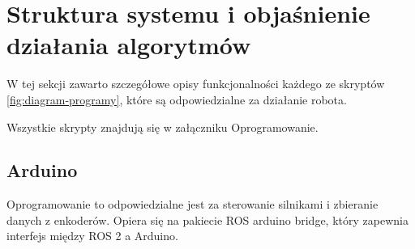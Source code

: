 \documentclass[a4paper,twoside,12pt]{book}
\begin{document}
\newpage
\section{Struktura systemu i objaśnienie działania algorytmów}

W tej sekcji zawarto szczegółowe opisy funkcjonalności każdego ze skryptów \ref{fig:diagram-programy}, które są odpowiedzialne za działanie robota.

Wszystkie skrypty znajdują się w załączniku Oprogramowanie.
\subsection{Arduino}
Oprogramowanie to odpowiedzialne jest za sterowanie silnikami i zbieranie danych z enkoderów. Opiera się na pakiecie ROS arduino bridge\cite{bib:rosarduinobridge}, który zapewnia interfejs między ROS 2 a Arduino. 
\end{document}

